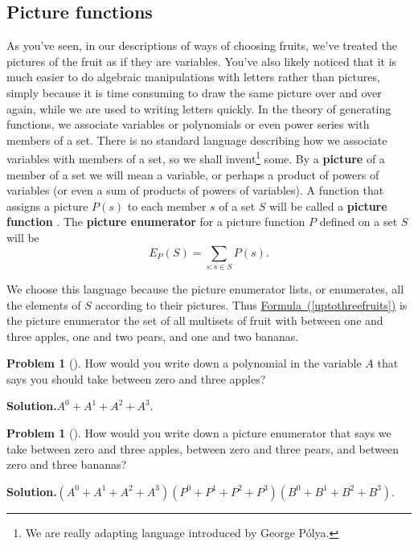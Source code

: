 \documentclass[10pt,]{book}
\newcommand{\terminology}[1]{\textbf{#1}}
\theoremstyle{plain}
\theoremstyle{definition}
\newtheorem{activity}[project]{Problem}
\theoremstyle{definition}
\numberwithin{equation}{chapter}
\begin{document}
\subsection[{Picture functions}]{Picture functions}\label{picturefunction}
As you've seen, in our descriptions of ways of choosing fruits, we've treated the pictures of the fruit as if they are variables. You've also likely noticed that it is much easier to do algebraic manipulations with letters rather than pictures, simply because it is time consuming to draw the same picture over and over again, while we are used to writing letters quickly. In the theory of generating functions, we associate variables or polynomials or even power series with members of a set. There is no standard language describing how we associate variables with members of a set, so we shall invent\footnote{We are really adapting language introduced by George Pólya.\label{fn-10}} some. By a \terminology{picture} of a member of a set we will mean a variable, or perhaps a product of powers of variables (or even a sum of products of powers of variables). A function that assigns a picture \(P(s)\) to each member \(s\) of a set \(S\) will be called a \terminology{picture function} . The \terminology{picture enumerator} for a picture function \(P\) defined on a set \(S\) will be%
\begin{equation*}
E_P(S) = \sum_{s: s\in S}  P(s).
\end{equation*}
%
\par
We choose this language because the picture enumerator lists, or enumerates, all the elements of \(S\) according to their pictures. Thus \hyperref[uptothreefruits]{Formula~(\ref{uptothreefruits})} is the picture enumerator the set of all multisets of fruit with between one and three apples, one and two pears, and one and two bananas.%
\begin{activity}[]\label{zerotothreeapples}
How would you write down a polynomial in the variable \(A\) that says you should take between zero and three apples?%
\par\medskip\noindent%
\textbf{Solution.}\quad \(A^0+A^1+A^2+A^3\).%
\end{activity}
\begin{activity}[]\label{zerotothreefruits}
How would you write down a picture enumerator that says we take between zero and three apples, between zero and three pears, and between zero and three bananas?%
\par\medskip\noindent%
\textbf{Solution.}\quad \((A^0+A^1+A^2+A^3)(P^0+P^1+P^2+P^3)(B^0+B^1+B^2+B^3).\)%
\end{activity}
\end{document}

